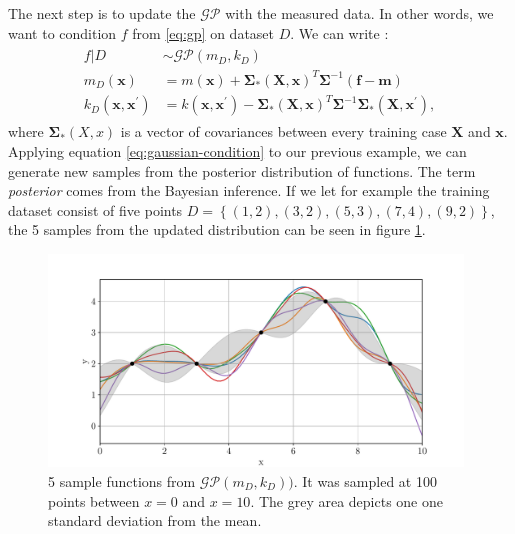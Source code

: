 The next step is to update the $\mathcal{GP}$ with the measured data. In other words, we want to condition $f$ from \ref{eq:gp} on dataset $D$. We can write \cite{rasmussen2004}:
\begin{align}
\begin{split}
	\label{eq:gaussian-condition}
	f \vert D & \sim\mathcal{GP}(m_D,k_D) \\
	m_D(\bm{x}) & = m(\bm{x}) + \bm{\Sigma_*(X,x)}^T \bm{\Sigma}^{-1} (\bm{f}-\bm{m}) \\
	k_D(\bm{x},\bm{x}^\prime) & = k(\bm{x},\bm{x}^\prime) - \bm{\Sigma_*(X,x)}^T \bm{\Sigma}^{-1} \bm{\Sigma_*(X,x^\prime)},
\end{split}
\end{align}
where $\bm{\Sigma_*}(X,x)$ is a vector of covariances between every training case $\bm{X}$ and $\bm{x}$. Applying equation \ref{eq:gaussian-condition} to our previous example, we can generate new samples from the posterior distribution of functions. The term \textit{posterior} comes from the Bayesian inference. If we let for example the training dataset consist of five points $D = \left\{(1,2),(3,2),(5,3),(7,4),(9,2)\right\}$, the 5 samples from the updated distribution can be seen in figure \ref{fig:gaussian-samples-posterior}.
\begin{figure}[htb]
	\centering
	\includegraphics[width=0.98\textwidth]{figures/gaussian-samples-post}
	\caption{5 sample functions from $\mathcal{GP}(m_D,k_D))$. It was sampled at 100 points between $x = 0$ and $x=10$. The grey area depicts one one standard deviation from the mean.}
	\label{fig:gaussian-samples-posterior}
\end{figure}

